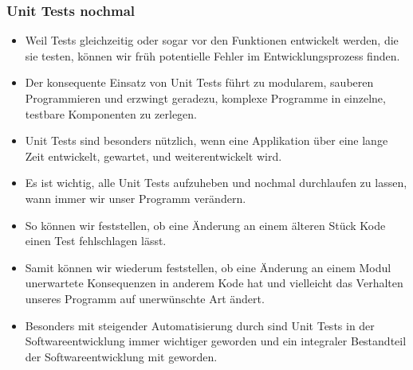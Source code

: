 \documentclass[aspectratio=169,mathserif,notheorems]{beamer}%
\begin{document}
%
\begin{frame}[t]%
\frametitle{Unit Tests nochmal}%
\begin{itemize}%
%
\item<2-> Weil Tests gleichzeitig oder sogar vor den Funktionen entwickelt werden, die sie testen, können wir früh potentielle Fehler im Entwicklungsprozess finden.%
\item<3-> Der konsequente Einsatz von Unit Tests führt zu modularem, sauberen Programmieren und erzwingt geradezu, komplexe Programme in einzelne, testbare Komponenten zu zerlegen.%
%
\item<4-> Unit Tests sind besonders nützlich, wenn eine Applikation über eine lange Zeit entwickelt, gewartet, und weiterentwickelt wird.%
%
\item<5-> Es ist wichtig, alle Unit Tests aufzuheben und nochmal durchlaufen zu lassen, wann immer wir unser Programm verändern.%
%
\item<6-> So können wir feststellen, ob eine Änderung an einem älteren Stück Kode einen Test fehlschlagen lässt.%
%
\item<7-> Samit können wir wiederum feststellen, ob eine Änderung an einem Modul unerwartete Konsequenzen in anderem Kode hat und vielleicht das Verhalten unseres Programm auf unerwünschte Art ändert.%
%
\item<8-> Besonders mit steigender Automatisierung durch  sind Unit Tests in der Softwareentwicklung immer wichtiger geworden\cite{W2000WISTAWIISH,TLG2006UTCU,R2006ASOUTP} und ein integraler Bestandteil der Softwareentwicklung mit \python geworden\cite{P2021PUTAAOAEUTIP,O2022PTWP,DG2020TIP}.%
\end{itemize}%
\end{frame}%
%
\end{document}
